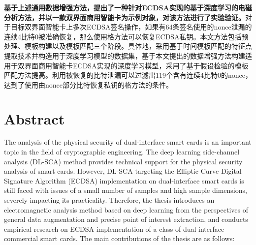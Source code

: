 \textbf{基于上述通用数据增强方法，提出了一种针对ECDSA实现的基于深度学习的电磁分析方法，并以一款双界面商用智能卡为示例对象，对该方法进行了实验验证。}对于目标双界面智能卡上多次ECDSA签名操作，如果有64条签名使用的nonce泄漏的连续4比特0被准确恢复，那么使用格方法可以恢复ECDSA私钥。本文方法包括预处理、模板构建以及模板匹配三个阶段。具体地，采用基于时间模板匹配的特征点提取技术并构造用于深度学习模型的数据集，基于本文提出的数据增强方法构建适用于双界面商用智能卡ECDSA实现的深度学习模型，采用了基于假设检验的模板匹配方法提高\zyx。利用被恢复的比特泄漏可以过滤出119个含有连续4比特0的nonce，达到了使用由nonce部分比特恢复私钥的格方法的条件。

\intobmk\chapter*{Abstract}%


The analysis of the physical security of dual-interface smart cards is an important topic in the field of cryptographic engineering. The deep learning side-channel analysis (DL-SCA) method provides technical support for the physical security analysis of smart cards. %
However, DL-SCA targeting the Elliptic Curve Digital Signature Algorithm (ECDSA) implementation on dual-interface smart cards is still faced with issues of a small number of samples and high sample dimensions, severely impacting its practicality. 
Therefore, the thesis introduces an electromagnetic analysis method based on deep learning from the perspectives of general data augmentation and precise point of interest extraction, and conducts empirical research on ECDSA implementation of a class of dual-interface commercial smart cards. The main contributions of the thesis are as follows:

